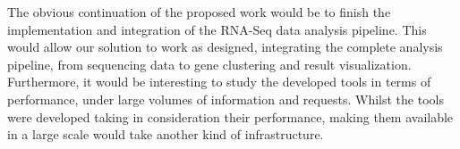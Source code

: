 \documentclass[9pt,a4paper]{extarticle}
\begin{document}
\begin{multicols}{2}
The obvious continuation of the proposed work would be to finish the
implementation and integration of the RNA-Seq data analysis pipeline. This would
allow our solution to work as designed, integrating the complete analysis
pipeline, from sequencing data to gene clustering and result visualization.
Furthermore, it would be interesting to study the developed tools in terms of
performance, under large volumes of information and requests. Whilst the tools
were developed taking in consideration their performance, making them available
in a large scale would take another kind of infrastructure.



\end{multicols}
\end{document}
